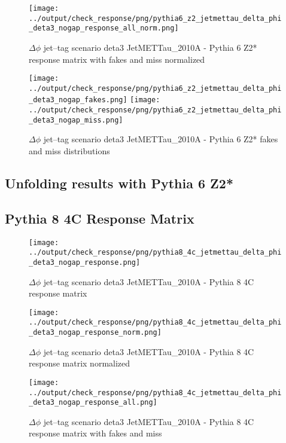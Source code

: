 \documentclass[11pt]{book}
\begin{document}
\begin{figure}[ht]
\centering
\texttt{[image: ../output/check\_response/png/pythia6\_z2\_jetmettau\_delta\_phi\_deta3\_nogap\_response\_all\_norm.png]}
\caption{$\Delta\phi$ jet--tag scenario deta3 JetMETTau\_2010A - Pythia 6 Z2* response matrix with fakes and miss normalized}
\label{p6_jetmettau_delta_phi_deta3_nogap_response_all_norm}
\end{figure}

\begin{figure}[ht]
\centering
\texttt{[image: ../output/check\_response/png/pythia6\_z2\_jetmettau\_delta\_phi\_deta3\_nogap\_fakes.png]}
\texttt{[image: ../output/check\_response/png/pythia6\_z2\_jetmettau\_delta\_phi\_deta3\_nogap\_miss.png]}
\caption{$\Delta\phi$ jet--tag scenario deta3 JetMETTau\_2010A - Pythia 6 Z2* fakes and miss distributions}
\label{p6_jetmettau_delta_phi_deta3_nogap_fakesmiss}
\end{figure}


\clearpage
\subsection{Unfolding results with Pythia 6 Z2*}


\clearpage
\subsection{Pythia 8 4C Response Matrix}


\begin{figure}[ht]
\centering
\texttt{[image: ../output/check\_response/png/pythia8\_4c\_jetmettau\_delta\_phi\_deta3\_nogap\_response.png]}
\caption{$\Delta\phi$ jet--tag scenario deta3 JetMETTau\_2010A - Pythia 8 4C response matrix}
\label{p8_jetmettau_delta_phi_deta3_nogap_response}
\end{figure}

\begin{figure}[ht]
\centering
\texttt{[image: ../output/check\_response/png/pythia8\_4c\_jetmettau\_delta\_phi\_deta3\_nogap\_response\_norm.png]}
\caption{$\Delta\phi$ jet--tag scenario deta3 JetMETTau\_2010A - Pythia 8 4C response matrix normalized}
\label{p8_jetmettau_delta_phi_deta3_nogap_response_norm}
\end{figure}

\begin{figure}[ht]
\centering
\texttt{[image: ../output/check\_response/png/pythia8\_4c\_jetmettau\_delta\_phi\_deta3\_nogap\_response\_all.png]}
\caption{$\Delta\phi$ jet--tag scenario deta3 JetMETTau\_2010A - Pythia 8 4C response matrix with fakes and miss}
\label{p8_jetmettau_delta_phi_deta3_nogap_response_all}
\end{figure}
\end{document}
